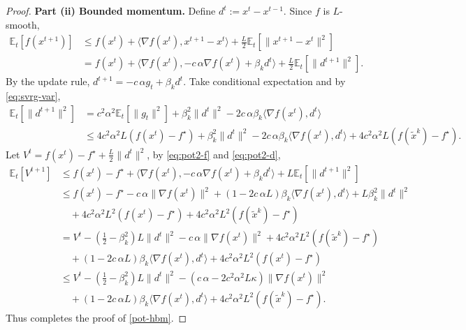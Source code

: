 \documentclass{article}
\theoremstyle{definition}
\newcommand{\assign}{:=}
\begin{document}
\begin{proof}
  \textbf{Part (ii) Bounded momentum.} Define $d^t \assign x^t - x^{t - 1}$.
  Since $f$ is $L$-smooth,
  \begin{align}
    \mathbb{E}_t [f (x^{t + 1})] &{}\leq f (x^t) + \langle \nabla f (x^t),
    x^{t + 1} - x^t \rangle + \tfrac{L}{2} \mathbb{E}_t [\| x^{t + 1} - x^t \|^2] \nonumber\\
    &{}= f (x^t) + \langle \nabla f (x^t), - c \, \alpha \nabla f (x^t) +
    \beta_k d^t \rangle + \tfrac{L}{2} \mathbb{E}_t [\| d^{t + 1} \|^2] . 
    \label{eq:pot2-f}
  \end{align}
  By the update rule, $d^{t + 1} = - c \, \alpha g_t + \beta_k d^t$. Take
  conditional expectation and by \eqref{eq:svrg-var},
  \begin{align}
    \mathbb{E}_t [\| d^{t + 1} \|^2] &{}= c^2 \alpha^2 \mathbb{E}_t [\| g_t
    \|^2] + \beta_k^2 \| d^t \|^2 - 2 c \, \alpha \beta_k \langle \nabla f (x^t),
    d^t \rangle \nonumber\\
    &{}\leq 4 c^2 \alpha^2 L (f (x^t) - f^{\star}) + \beta_k^2 \| d^t \|^2 -
    2 c \, \alpha \beta_k \langle \nabla f (x^t), d^t \rangle + 4 c^2 \alpha^2 L
    (f (\tilde{x}^k) - f^{\star}) .  \label{eq:pot2-d}
  \end{align}
  Let $V^t = f (x^t) - f^{\star} + \tfrac{L}{2} \| d^t \|^2$, by
  \eqref{eq:pot2-f} and \eqref{eq:pot2-d},
  \begin{align*}
    \mathbb{E}_t [V^{t + 1}] &{}\leq f (x^t) - f^{\star} + \langle \nabla f
    (x^t), - c \, \alpha \nabla f (x^t) + \beta_k d^t \rangle + L\mathbb{E}_t [\|
    d^{t + 1} \|^2]\\
    &{}\leq f (x^t) - f^{\star} - c \, \alpha \| \nabla f (x^t) \|^2 + (1 - 2 c \,
    \alpha L) \beta_k \langle \nabla f (x^t), d^t \rangle + L \beta_k^2 \| d^t
    \|^2\\
    &{}\quad + 4 c^2 \alpha^2 L^2 (f (x^t) - f^{\star}) + 4 c^2 \alpha^2 L^2 (f
    (\tilde{x}^k) - f^{\star})\\
    &{}= V^t - \left( \tfrac{1}{2} - \beta_k^2 \right) L \| d^t \|^2 - c \,
    \alpha \| \nabla f (x^t) \|^2 + 4 c^2 \alpha^2 L^2 (f (\tilde{x}^k) -
    f^{\star})\\
    &{}\quad + (1 - 2 c \, \alpha L) \beta_k \langle \nabla f (x^t), d^t \rangle + 4
    c^2 \alpha^2 L^2 (f (x^t) - f^{\star})\\
    &{}\leq V^t - \left( \tfrac{1}{2} - \beta_k^2 \right) L \| d^t \|^2 - (c \,
    \alpha - 2 c^2 \alpha^2 L \kappa) \| \nabla f (x^t) \|^2\\
    &{}\quad + (1 - 2 c \, \alpha L) \beta_k \langle \nabla f (x^t), d^t \rangle + 4
    c^2 \alpha^2 L^2 (f (\tilde{x}^k) - f^{\star}).
  \end{align*}
  Thus completes the proof of \eqref{pot-hbm}.
\end{proof}
\end{document}
